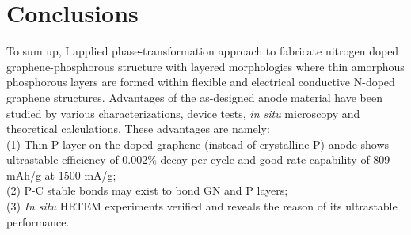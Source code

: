 \section{Conclusions}
To sum up, I applied phase-transformation approach to fabricate nitrogen doped graphene-phosphorous structure with layered morphologies where thin amorphous phosphorous layers are formed within flexible and electrical conductive N-doped graphene structures. 
Advantages of the as-designed anode material have been studied by various characterizations, device tests, {\em in situ} microscopy and theoretical calculations. 
These advantages are namely: \\
(1) Thin P layer on the doped graphene (instead of crystalline P) anode shows ultrastable efficiency of 0.002\% decay per cycle and good rate capability of 809 mAh/g at 1500 mA/g; \\
(2) P-C stable bonds may exist to bond GN and P layers; \\
(3) {\em In situ} HRTEM experiments verified and reveals the reason of its ultrastable performance.\\




